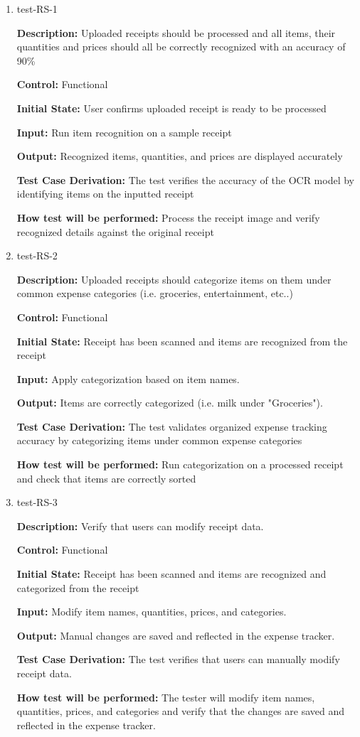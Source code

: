 \documentclass[12pt, titlepage]{article}
\begin{document}
\begin{enumerate}
\item{test-RS-1\\}

\textbf{Description:} Uploaded receipts should be processed and all items, their quantities and prices should all be correctly recognized with an accuracy of 90\%

\textbf{Control:} Functional

\textbf{Initial State:} User confirms uploaded receipt is ready to be processed

\textbf{Input:} Run item recognition on a sample receipt

\textbf{Output:} Recognized items, quantities, and prices are displayed accurately

\textbf{Test Case Derivation:} The test verifies the accuracy of the OCR model by identifying items on the inputted receipt

\textbf{How test will be performed:} Process the receipt image and verify recognized details against the original receipt

\item{test-RS-2\\}

\textbf{Description:} Uploaded receipts should categorize items on them under common expense categories (i.e. groceries, entertainment, etc..)

\textbf{Control:} Functional

\textbf{Initial State:} Receipt has been scanned and items are recognized from the receipt

\textbf{Input:} Apply categorization based on item names.

\textbf{Output:} Items are correctly categorized (i.e. milk under "Groceries").

\textbf{Test Case Derivation:} The test validates organized expense tracking accuracy by categorizing items under common expense categories

\textbf{How test will be performed:} Run categorization on a processed receipt and check that items are correctly sorted


\item{test-RS-3\\}

\textbf{Description:} Verify that users can modify receipt data.

\textbf{Control:} Functional

\textbf{Initial State:} Receipt has been scanned and items are recognized and
categorized from the receipt

\textbf{Input:} Modify item names, quantities, prices, and categories.

\textbf{Output:} Manual changes are saved and reflected in the expense tracker.

\textbf{Test Case Derivation:} The test verifies that users can manually modify
receipt data.

\textbf{How test will be performed:} The tester will modify item names,
quantities, prices, and categories and verify that the changes are saved and
reflected in the expense tracker.


\end{enumerate}
\end{document}
